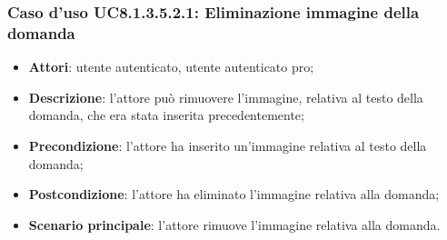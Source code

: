 \subsubsection{Caso d'uso UC8.1.3.5.2.1: Eliminazione immagine della domanda}
\begin{itemize}
	\item\textbf{Attori}: utente autenticato, utente autenticato pro;
	\item\textbf{Descrizione}: l'attore può rimuovere l'immagine, relativa al testo della domanda, che era stata inserita precedentemente;
	\item\textbf{Precondizione}: l'attore ha inserito un'immagine relativa al testo della domanda;
	\item \textbf{Postcondizione}: l'attore ha eliminato l'immagine relativa alla domanda;
	\item\textbf{Scenario principale}: l'attore rimuove l'immagine relativa alla domanda. 
\end{itemize}

